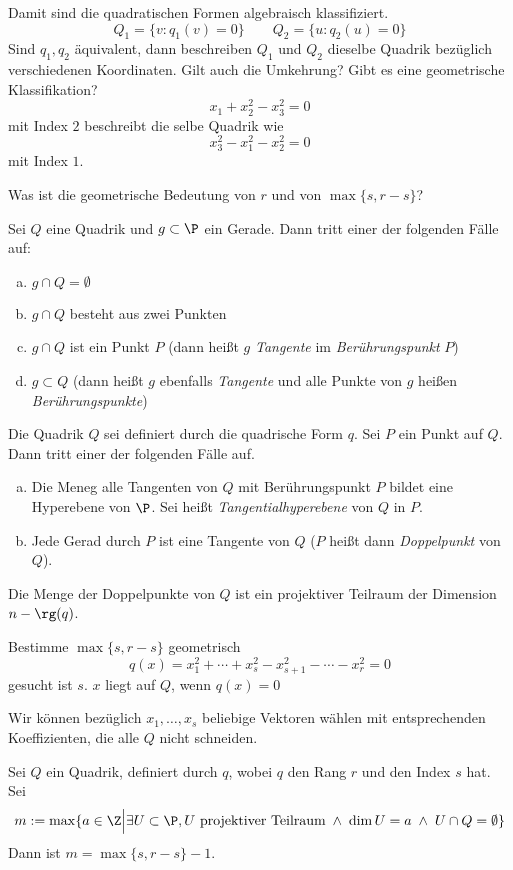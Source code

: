 \documentclass{mycourse}
\begin{document}
Damit sind die quadratischen Formen algebraisch klassifiziert.
\[
	Q_1 = \{v: q_1(v) = 0\} \qquad Q_2=\{u: q_2(u) = 0\}
\]
Sind $q_1,q_2$ äquivalent, dann beschreiben $Q_1$ und $Q_2$ dieselbe Quadrik bezüglich verschiedenen Koordinaten.
Gilt auch die Umkehrung?
Gibt es eine geometrische Klassifikation?
\[
	x_1 + x_2^2 - x_3^2 =0
\]
mit Index $2$ beschreibt die selbe Quadrik wie
\[
	x_3^2 - x_1^2 -x_2^2 = 0
\]
mit Index $1$.

Was ist die geometrische Bedeutung von $r$ und von $\max\{s,r-s\}$?

\begin{prop}
	\label{prop:15.11}
	Sei $Q$ eine Quadrik und $g\subset \P$ ein Gerade.
	Dann tritt einer der folgenden Fälle auf:
	\begin{enumerate}[(a)]
		\item
			$g\cap Q = \emptyset$
		\item
			$g\cap Q$ besteht aus zwei Punkten
		\item
			$g \cap Q$ ist ein Punkt $P$ (dann heißt $g$ \emph{Tangente} im \emph{Berührungspunkt} $P$)
		\item
			$g \subset Q$ (dann heißt $g$ ebenfalls \emph{Tangente} und alle Punkte von $g$ heißen \emph{Berührungspunkte})
	\end{enumerate}
\end{prop}

\begin{prop}
	\label{prop:15.12}
	Die Quadrik $Q$ sei definiert durch die quadrische Form $q$.
	Sei $P$ ein Punkt auf $Q$.
	Dann tritt einer der folgenden Fälle auf.
	\begin{enumerate}[(a)]
		\item 
			Die Meneg alle Tangenten von $Q$ mit Berührungspunkt $P$ bildet eine Hyperebene von $\P$.
			Sei heißt \emph{Tangentialhyperebene} von $Q$ in $P$.
		\item
			Jede Gerad durch $P$ ist eine Tangente von $Q$ ($P$ heißt dann \emph{Doppelpunkt} von $Q$).
	\end{enumerate}
	Die Menge der Doppelpunkte von $Q$ ist ein projektiver Teilraum der Dimension $n-\rg(q)$.
\end{prop}

Bestimme $\max\{s,r-s\}$ geometrisch
\[
	q(x) = x_1^2 + \dotsb + x_s^2 - x_{s+1}^2 - \dotsb - x_r^2 = 0
\]
gesucht ist $s$.
$x$ liegt auf $Q$, wenn $q(x)=0$

Wir können bezüglich $x_1,\dotsc,x_s$ beliebige Vektoren wählen mit entsprechenden Koeffizienten, die alle $Q$ nicht schneiden.

\begin{prop}
	\label{prop:15.13}
	Sei $Q$ ein Quadrik, definiert durch $q$, wobei $q$ den Rang $r$ und den Index $s$ hat.
	Sei
	\[
		m := \max\{ a\in \Z \Big| \exists U \subset \P, U \text{ projektiver Teilraum}\; \land\; \dim U = a \;\land\; U \cap Q = \emptyset\}
	\]
	Dann ist $m=\max\{s,r-s\}-1$.
\end{prop}
\end{document}
